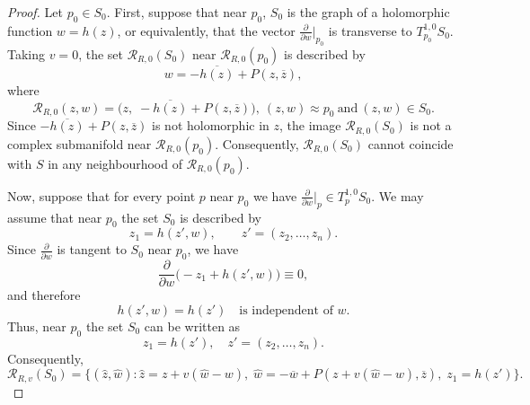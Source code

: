 \documentclass[a4paper,centertags,oneside,12pt]{amsart}
\numberwithin{equation}{section}
\begin{document}
\begin{proof}
Let \(p_0 \in S_0\). First, suppose that near \(p_0\), \(S_0\) is the graph of a holomorphic function \(w = h(z)\), or equivalently, that the vector \(\frac{\partial}{\partial w}\big|_{p_0}\) is transverse to \(T_{p_0}^{1,0}S_0\). Taking \(v = 0\), the set \(\mathcal R_{R,0}(S_0)\) near \(\mathcal R_{R, 0}(p_0)\) is described by
\[
w = -\overline{h(z)} + P(z,\overline{z}),
\]
where 
\[
\mathcal R_{R,0}(z,w) = \bigl(z,\; -\overline{h(z)} + P(z,\overline{z})\bigr), ~(z, w)\approx p_0 ~\text{and}~ (z, w)\in S_0.
\]
Since \(-\overline{h(z)} + P(z,\overline{z})\) is not holomorphic in \(z\), the image \(\mathcal R_{R,0}(S_0)\) is not a complex submanifold near \(\mathcal R_{R,0}(p_0)\). Consequently, \(\mathcal R_{R,0}(S_0)\) cannot coincide with \(S\) in any neighbourhood of \(\mathcal R_{R,0}(p_0)\).

Now, suppose that for every point \(p\) near \(p_0\) we have \(\frac{\partial}{\partial w}\big|_{p} \in T_p^{1,0}S_0\). 
We may assume that near \(p_0\) the set \(S_0\) is described by
\begin{equation*}
z_1 = h(z',w),\qquad z' = (z_2,\dots ,z_{n}).
\end{equation*}
Since \(\frac{\partial}{\partial w}\) is tangent to \(S_0\) near \(p_0\), we have
\begin{equation*}
\frac{\partial}{\partial w}\bigl(-z_1+h(z',w)\bigr)\equiv 0,
\end{equation*}
and therefore
\begin{equation*}
h(z',w)=h(z')\quad\text{is independent of } w.
\end{equation*}
Thus, near \(p_0\) the set \(S_0\) can be written as
\begin{equation*}
z_1 = h(z'),\quad z' = (z_2,\dots ,z_n).
\end{equation*}
Consequently,
\begin{equation*}
\mathcal R_{R,v}(S_0)=\{(\widehat z,\widehat w):\widehat z=z+v(\widehat w-w),\;\widehat w=-\overline w+P(z+v(\widehat w-w),\overline z),\;z_1=h(z')\}.
\end{equation*}


\end{proof}
\end{document}
